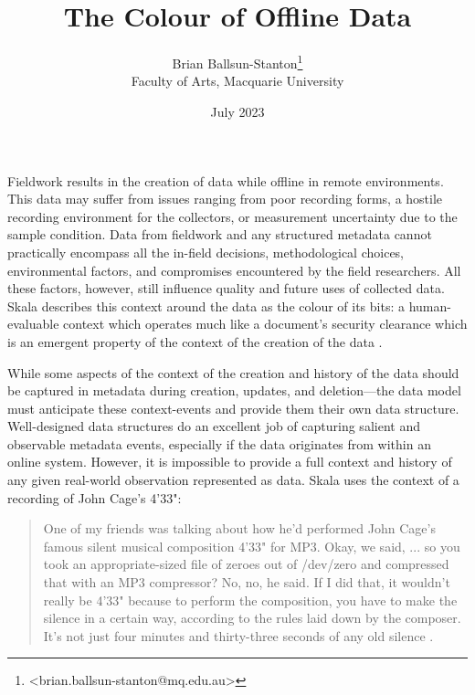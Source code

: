 \documentclass{scrarticle}
\title{The Colour of Offline Data}
\author{Brian Ballsun-Stanton\orcidlink{0000-0003-4932-7912}\footnote{<brian.ballsun-stanton@mq.edu.au>}\\Faculty of Arts, Macquarie University}
\date{July 2023}
\begin{document}
\maketitle




Fieldwork results in the creation of data while offline in remote environments. This data may suffer from issues ranging from poor recording forms, a hostile recording environment for the collectors, or measurement uncertainty due to the sample condition. Data from fieldwork and any structured metadata 
cannot practically encompass all the in-field decisions, methodological choices, environmental factors, and compromises encountered by the field researchers. All these factors, however, still influence quality and future uses of collected data. Skala describes this context around the data as the colour of its bits: a human-evaluable context which operates much like a document's security clearance which is an emergent property of the context of the creation of the data \parencite*{Skala2004-zc}. 

While some aspects of the context of the creation and history of the data should be captured in metadata during creation, updates, and deletion---the data model must anticipate these context-events and provide them their own data structure. Well-designed data structures do an excellent job of capturing salient and observable metadata events, especially if the data originates from within an online system. However, it is impossible to provide a full context and history of any given real-world observation represented as data.
Skala uses the context of a recording of John Cage's 4'33":
\begin{quote}
One of my friends was talking about how he'd performed John Cage's famous silent musical composition 4'33" for MP3.  Okay, we said, ... so you took an appropriate-sized file of zeroes out of /dev/zero and compressed that with an MP3 compressor?  No, no, he said.  If I did that, it wouldn't really be 4'33" because to perform the composition, you have to make the silence in a certain way, according to the rules laid down by the composer.  It's not just four minutes and thirty-three seconds of any old silence  \parencite*{Skala2004-zc}.
\end{quote}
\end{document}
